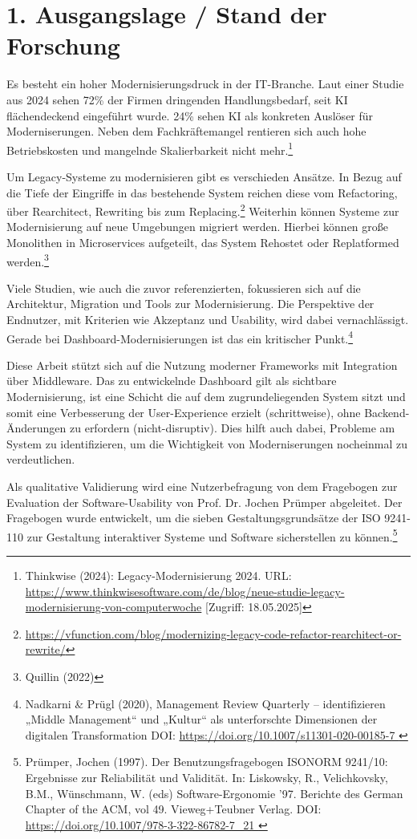 \section*{1. Ausgangslage / Stand der Forschung}

Es besteht ein hoher Modernisierungsdruck in der IT-Branche. Laut einer Studie aus 2024 sehen 72\% der Firmen dringenden Handlungsbedarf, seit KI flächendeckend eingeführt wurde. 24\% sehen KI als konkreten Auslöser für Moderniserungen. Neben dem Fachkräftemangel rentieren sich auch hohe Betriebskosten und mangelnde Skalierbarkeit nicht mehr.\footnote{Thinkwise (2024): Legacy-Modernisierung 2024. URL: \url{https://www.thinkwisesoftware.com/de/blog/neue-studie-legacy-modernisierung-von-computerwoche} [Zugriff: 18.05.2025]}

Um Legacy-Systeme zu modernisieren gibt es verschieden Ansätze. In Bezug auf die Tiefe der Eingriffe in das bestehende System reichen diese vom Refactoring, über Rearchitect, Rewriting bis zum Replacing.\footnote{\url{https://vfunction.com/blog/modernizing-legacy-code-refactor-rearchitect-or-rewrite/}}
Weiterhin können Systeme zur Modernisierung auf neue Umgebungen migriert werden. Hierbei können große Monolithen in Microservices aufgeteilt, das System Rehostet oder Replatformed werden.\footnote{Quillin (2022)}

Viele Studien, wie auch die zuvor referenzierten, fokussieren sich auf die Architektur, Migration und Tools zur Modernisierung. Die Perspektive der Endnutzer, mit Kriterien wie Akzeptanz und Usability, wird dabei vernachlässigt. Gerade bei Dashboard-Modernisierungen ist das ein kritischer Punkt.\footnote{Nadkarni \& Prügl (2020), Management Review Quarterly – identifizieren „Middle Management“ und „Kultur“ als unterforschte Dimensionen der digitalen Transformation DOI: \url{https://doi.org/10.1007/s11301-020-00185-7   }}

Diese Arbeit stützt sich auf die Nutzung moderner Frameworks mit Integration über Middleware. Das zu entwickelnde Dashboard gilt als sichtbare Modernisierung, ist eine Schicht die auf dem zugrundeliegenden System sitzt und somit eine Verbesserung der User-Experience erzielt (schrittweise), ohne Backend-Änderungen zu erfordern (nicht-disruptiv). Dies hilft auch dabei, Probleme am System zu identifizieren, um die Wichtigkeit von Moderniserungen nocheinmal zu verdeutlichen.

Als qualitative Validierung wird eine Nutzerbefragung von dem Fragebogen zur Evaluation der Software-Usability von Prof. Dr. Jochen Prümper abgeleitet. Der Fragebogen wurde entwickelt, um die sieben Gestaltungsgrundsätze der ISO 9241-110 zur Gestaltung interaktiver Systeme und Software sicherstellen zu können.\footnote{Prümper, Jochen (1997). Der Benutzungsfragebogen ISONORM 9241/10: Ergebnisse zur Reliabilität und Validität. In: Liskowsky, R., Velichkovsky, B.M., Wünschmann, W. (eds) Software-Ergonomie ’97. Berichte des German Chapter of the ACM, vol 49. Vieweg+Teubner Verlag. DOI: \url{https://doi.org/10.1007/978-3-322-86782-7_21   }}
